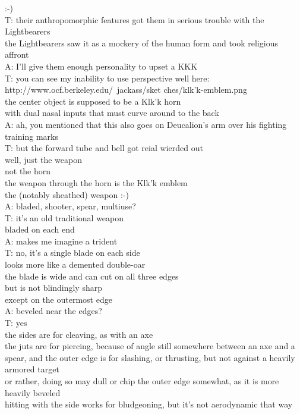 :-)\\
T: their anthropomorphic features got them in serious trouble with the Lightbearers\\
the Lightbearers saw it as a mockery of the human form and took religious affront\\
A: I'll give them enough personality to upset a KKK\\
T: you can see my inability to use perspective well here: http://www.ocf.berkeley.edu/~jackass/sket ches/klk'k-emblem.png\\
the center object is supposed to be a Klk'k horn\\
with dual nasal inputs that must curve around to the back\\
A: ah, you mentioned that this also goes on Deucalion's arm over his fighting training marks\\
T: but the forward tube and bell got reial wierded out\\
well, just the weapon\\
not the horn\\
the weapon through the horn is the Klk'k emblem\\
 the (notably sheathed) weapon :-)\\
A: bladed, shooter, spear, multiuse?\\
T: it's an old traditional weapon\\
bladed on each end\\
A: makes me imagine a trident\\
T: no, it's a single blade on each side\\
looks more like a demented double-oar\\
the blade is wide and can cut on all three edges\\
but is not blindingly sharp\\
except on the outermost edge\\
A: beveled near the edges?\\
T: yes\\
the sides are for cleaving, as with an axe\\
the juts are for piercing, because of angle still somewhere between an axe and a spear, and the outer edge is for slashing, or thrusting, but not against a heavily armored target\\
or rather, doing so may dull or chip the outer edge somewhat, as it is more heavily beveled\\
hitting with the side works for bludgeoning, but it's not aerodynamic that way\\
